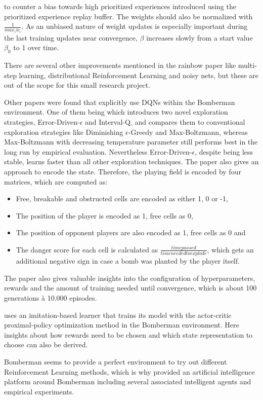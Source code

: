 to counter a bias towards high prioritized experiences introduced using the prioritized experience replay buffer. The weights should also be normalized with $\frac{1}{max_i w_i}$. As an unbiased nature of weight updates is especially important during the last training updates near convergence, $\beta$ increases slowly from a start value $\beta_0$ to 1 over time. 

There are several other improvements mentioned in the rainbow paper \cite{Hessel2017} like multi-step learning, distributional Reinforcement Learning and noisy nets, but these are out of the scope for this small research project. 

Other papers were found that explicitly use DQNs within the Bomberman environment. One of them being \cite{Kormelink2018} which introduces two novel exploration strategies, Error-Driven-$\epsilon$ and Interval-Q, and compares them to conventional exploration strategies like Diminishing $\epsilon$-Greedy and Max-Boltzmann, whereas Max-Boltzmann with decreasing temperature parameter still performs best in the long run by empirical evaluation. Nevertheless Error-Driven-$\epsilon$, despite being less stable, learns faster than all other exploration techniques. The paper also gives an approach to encode the state. Therefore, the playing field is encoded by four matrices, which are computed as:

\begin{itemize}
	\item Free, breakable and obstructed cells are encoded as either 1, 0 or -1,
	\item The position of the player is encoded as 1, free cells as 0,
	\item The position of opponent players are also encoded as 1, free cells as 0 and
	\item The danger score for each cell is calculated as $\frac{time passed}{time needed to explode}$, which gets an additional negative sign in case a bomb was planted by the player itself.
\end{itemize}

The paper also gives valuable insights into the configuration of hyperparameters, rewards and the amount of training needed until convergence, which is about 100 generations à 10.000 episodes. 

\cite{Franca2019} uses an imitation-based learner that trains its model with the actor-critic proximal-policy optimization method in the Bomberman environment. Here insights about how rewards need to be chosen and which state representation to choose can also be derived. 

Bomberman seems to provide a perfect environment to try out different Reinforcement Learning methods, which is why \cite{daCruzLopes2016} provided an artificial intelligence platform around Bomberman including several associated intelligent agents and empirical experiments. 
